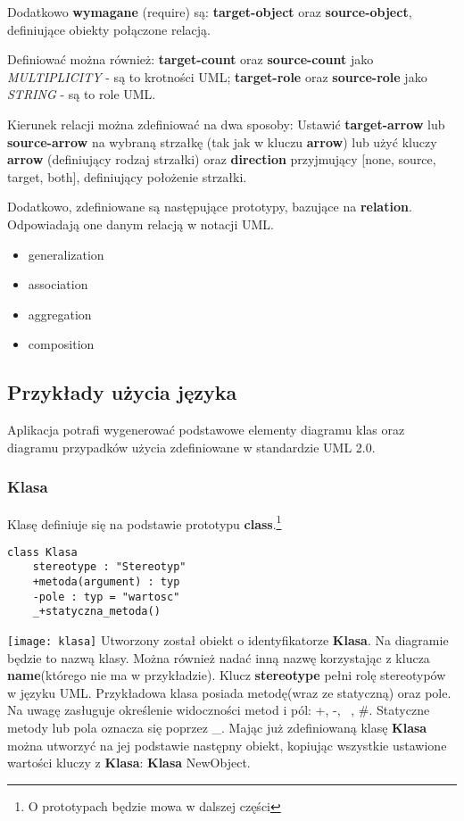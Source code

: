 Dodatkowo \textbf{wymagane} (require) są: \textbf{target-object} oraz \textbf{source-object}, definiujące obiekty połączone relacją.

Definiować można również: \textbf{target-count} oraz \textbf{source-count} jako \emph{MULTIPLICITY} - są to krotności UML; \textbf{target-role} oraz \textbf{source-role} jako \emph{STRING} - są to role UML.

Kierunek relacji można zdefiniować na dwa sposoby: Ustawić \textbf{target-arrow} lub \textbf{source-arrow} na wybraną strzałkę (tak jak w kluczu \textbf{arrow}) lub użyć kluczy \textbf{arrow} (definiujący rodzaj strzałki) oraz \textbf{direction} przyjmujący [none, source, target, both], definiujący położenie strzałki.

Dodatkowo, zdefiniowane są następujące prototypy, bazujące na \textbf{relation}. Odpowiadają one danym relacją w notacji UML.
\begin{itemize}
	\item generalization
	\item association
	\item aggregation
	\item composition
\end{itemize}


\subsection{Przykłady użycia języka}

Aplikacja potrafi wygenerować podstawowe elementy diagramu klas oraz diagramu przypadków użycia zdefiniowane w standardzie UML 2.0.

\subsubsection{Klasa}

Klasę definiuje się na podstawie prototypu \textbf{class}.\footnote{O prototypach będzie mowa w dalszej części}

\begin{lstlisting}
class Klasa
    stereotype : "Stereotyp"
    +metoda(argument) : typ
    -pole : typ = "wartosc"
    _+statyczna_metoda()
\end{lstlisting}
\texttt{[image: klasa]}
Utworzony został obiekt o identyfikatorze \textbf{Klasa}. Na diagramie będzie to nazwą klasy. Można również nadać inną nazwę korzystając z klucza \textbf{name}(którego nie ma w przykładzie). Klucz \textbf{stereotype} pełni rolę stereotypów w języku UML. Przykładowa klasa posiada metodę(wraz ze statyczną) oraz pole. Na uwagę zasługuje określenie widoczności metod i pól: +, -, ~, \#. Statyczne metody lub pola oznacza się poprzez \_.
Mając już zdefiniowaną klasę \textbf{Klasa} można utworzyć na jej podstawie następny obiekt, kopiując wszystkie ustawione wartości kluczy z \textbf{Klasa}: \textbf{Klasa} NewObject.

